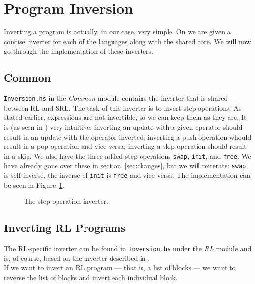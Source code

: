 \section{Program Inversion}

Inverting a program is actually, in our case, very simple. On \cite[p.~104]{REV} we are given a concise inverter for each of the languages along with the shared core. We will now go through the implementation of these inverters.

\subsection{Common}
\label{sec:invcommon}

\texttt{Inversion.hs} in the \textit{Common} module contains the inverter that is shared between RL and SRL. The task of this inverter is to invert step operations. As stated earlier, expressions are not invertible, so we can keep them as they are. It is (as seen in \cite[Fig.~20]{REV}) very intuitive: inverting an update with a given operator should result in an update with the operator inverted; inverting a push operation whould result in a pop operation and vice versa; inverting a skip operation should result in a skip. We also have the three added step operations \texttt{swap}, \texttt{init}, and \texttt{free}. We have already gone over these in section~\ref{sec:changes}, but we will reiterate: \texttt{swap} is self-inverse, the inverse of \texttt{init} is \texttt{free} and vice versa. The implementation can be seen in Figure~\ref{fig:commoninvert}.

\begin{figure}[H]
  
  \caption{The step operation inverter.}\label{fig:commoninvert}
\end{figure}

\subsection{Inverting RL Programs}

The RL-specific inverter can be found in \texttt{Inversion.hs} under the \textit{RL} module and is, of course, based on the inverter described in \cite[Fig.~19]{REV}.\\

\noindent If we want to invert an RL program --- that is, a list of blocks --- we want to reverse the list of blocks and invert each individual block.\\


